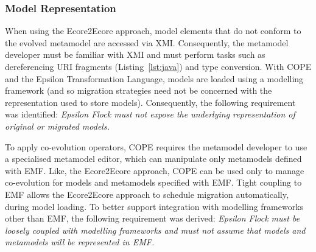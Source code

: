 \subsubsection{Model Representation}
When using the Ecore2Ecore approach, model elements that do not conform to the evolved metamodel are accessed via XMI. Consequently, the metamodel developer must be familiar with XMI and must perform tasks such as dereferencing URI fragments (Listing~\ref{lst:java}) and type conversion. With COPE and the Epsilon Transformation Language, models are loaded using a modelling framework (and so migration strategies need not be concerned with the representation used to store models). Consequently, the following requirement was identified: \emph{Epsilon Flock must not expose the underlying representation of original or migrated models.}

To apply co-evolution operators, COPE requires the metamodel developer to use a specialised metamodel editor, which can manipulate only metamodels defined with EMF. Like, the Ecore2Ecore approach, COPE can be used only to manage co-evolution for models and metamodels specified with EMF. Tight coupling to EMF allows the Ecore2Ecore approach to schedule migration automatically, during model loading. To better support integration with modelling frameworks other than EMF, the following requirement was derived: \emph{Epsilon Flock must be loosely coupled with modelling frameworks and must not assume that models and metamodels will be represented in EMF.}


% 
% 
% 


